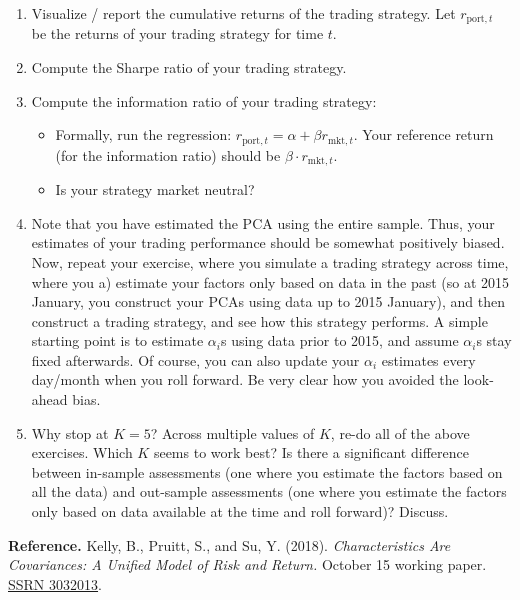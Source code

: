\documentclass[12pt,letterpaper]{article}
\begin{document}
\begin{enumerate}
\item Visualize / report the cumulative returns of the trading strategy.
Let $r_{\mathrm{port},t}$ be the returns of your trading strategy for
time $t$.

\item Compute the Sharpe ratio of your trading strategy.

\item Compute the information ratio of your trading strategy:

\begin{itemize}
    \item Formally, run the regression:
    $r_{\mathrm{port},t}=\alpha+\beta r_{\mathrm{mkt},t}$.
    Your reference return (for the information ratio) should be
    $\beta\cdot r_{\mathrm{mkt},t}$.
    \item Is your strategy market neutral?
\end{itemize}

\item Note that you have estimated the PCA using the entire sample.
Thus, your estimates of your trading performance should be somewhat
positively biased. Now, repeat your exercise, where you simulate a
trading strategy across time, where you a) estimate your factors only
based on data in the past (so at 2015 January, you construct your
PCAs using data up to 2015 January), and then construct a trading
strategy, and see how this strategy performs. A simple starting point
is to estimate $\alpha_i$s using data prior to 2015, and assume
$\alpha_i$s stay fixed afterwards. Of course, you can also update your
$\alpha_i$ estimates every day/month when you roll forward. Be very
clear how you avoided the look-ahead bias.

\item Why stop at $K=5$? Across multiple values of $K$, re-do all of
the above exercises. Which $K$ seems to work best? Is there a
significant difference between in-sample assessments (one where you
estimate the factors based on all the data) and out-sample assessments
(one where you estimate the factors only based on data available at
the time and roll forward)? Discuss.
\end{enumerate}

\small
\noindent\textbf{Reference.}
Kelly, B., Pruitt, S., and Su, Y. (2018).
\emph{Characteristics Are Covariances: A Unified Model of Risk and Return.}
October 15 working paper. \href{https://ssrn.com/abstract=3032013}{SSRN 3032013}.

\newpage
\end{document}
